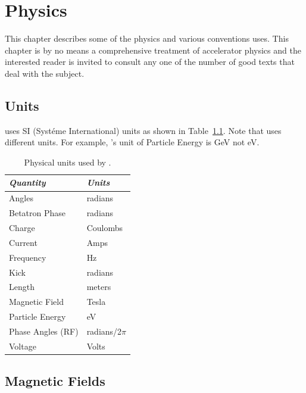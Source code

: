 \chapter{Physics}

This chapter describes some of the physics and various conventions
\bmad uses. This chapter is by no means a comprehensive treatment
of accelerator physics and the interested reader is invited to consult 
any one of the number of good texts that deal with the subject.

\section{Units}
\label{s:units}

\bmad uses SI (Syst\'eme International) units as shown in
Table~\ref{t:units}.  Note that \mad uses different units. For example,
\mad's unit of Particle Energy is GeV not eV.
\begin{table}[ht]
\centering
\begin{tabular}{|l|l|} \hline
  {\em Quantity}     & {\em Units}       \\ \hline
  Angles             &    radians        \\ 
  Betatron Phase     &    radians        \\
  Charge             &    Coulombs       \\
  Current            &    Amps           \\ 
  Frequency          &    Hz             \\ 
  Kick               &    radians        \\ 
  Length             &    meters         \\ 
  Magnetic Field     &    Tesla          \\ 
  Particle Energy    &    eV             \\ 
  Phase Angles (RF)  &    radians/2$\pi$ \\ 
  Voltage            &    Volts          \\ \hline
\end{tabular}
\caption{Physical units used by \bmad.}
\label{t:units}
\end{table}

\section{Magnetic Fields}
\label{s:fields}

